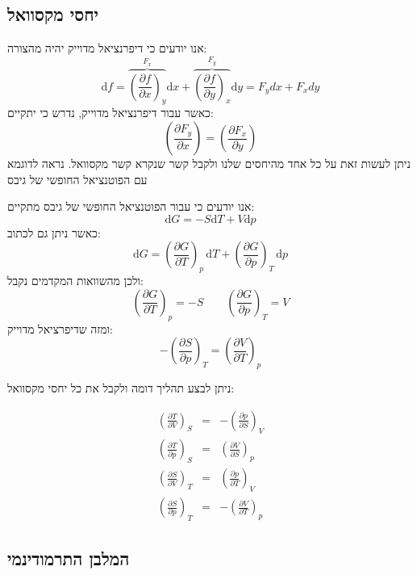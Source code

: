 \documentclass{tstextbook}
\begin{document}
\subsection{יחסי מקסוואל}

אנו יודעים כי דיפרנציאל מדוייק יהיה מהצורה:
$$\mathrm{d}f=\overbrace{ \left({\frac{\partial f}{\partial x}}\right)_{y} }^{ F_{x} }\mathrm{d}x+\overbrace{ \left({\frac{\partial f}{\partial y}}\right)_{x} }^{ F_{y} }\mathrm{d}y=F_{y}dx+F_{x}dy$$
כאשר עבור דיפרנציאל מדוייק, נדרש כי יתקיים:
$$\left({\frac{\partial F_{y}}{\partial x}}\right)=\left({\frac{\partial F_{x}}{\partial y}}\right)$$
ניתן לעשות זאת על כל אחד מהיחסים שלנו ולקבל קשר שנקרא קשר מקסוואל. נראה לדוגמא עם הפוטנציאל החופשי של גיבס

\begin{example}
אנו יודעים כי עבור הפוטנציאל החופשי של גיבס מתקיים:
$$\mathrm{d}G=-S\mathrm{d}T+V\mathrm{d}p$$
כאשר ניתן גם לכתוב:
$$\mathrm{d}G=\left({\frac{\partial G}{\partial T}}\right)_{p}\,\mathrm{d}T+\left({\frac{\partial G}{\partial p}}\right)_{T}\,\mathrm{d}p$$
ולכן מהשוואות המקדמים נקבל:
$$\left({\frac{\partial G}{\partial T}}\right)_{p} = -S\qquad \left( \frac{\partial G}{\partial p}  \right)_{T}=V$$
ומזה שדיפרציאל מדוייק:
$$-\left({\frac{\partial S}{\partial p}}\right)_{T}=\left({\frac{\partial V}{\partial T}}\right)_{p}$$

\end{example}
ניתן לבצע תהליך דומה ולקבל את כל יחסי מקסוואל:

\begin{proposition}
\begin{gather*}{{\left(\frac{\partial T}{\partial V}\right)_{S}}}&{{=}}&{{-\left(\frac{\partial p}{\partial S}\right)_{V}}}\\ {{\left(\frac{\partial T}{\partial p}\right)_{S}}}&{{=}}&{{\left(\frac{\partial V}{\partial S}\right)_{p}}}\\ {{\left(\frac{\partial S}{\partial V}\right)_{T}}}&{{=}}&{{\left(\frac{\partial p}{\partial T}\right)_{V}}}\\ {{\left(\frac{\partial S}{\partial p}\right)_{T}}}&{{=}}&{{-\left(\frac{\partial V}{\partial T}\right)_{p}}}\end{gather*}

\end{proposition}
\subsection{המלבן התרמודינמי}
\end{document}
